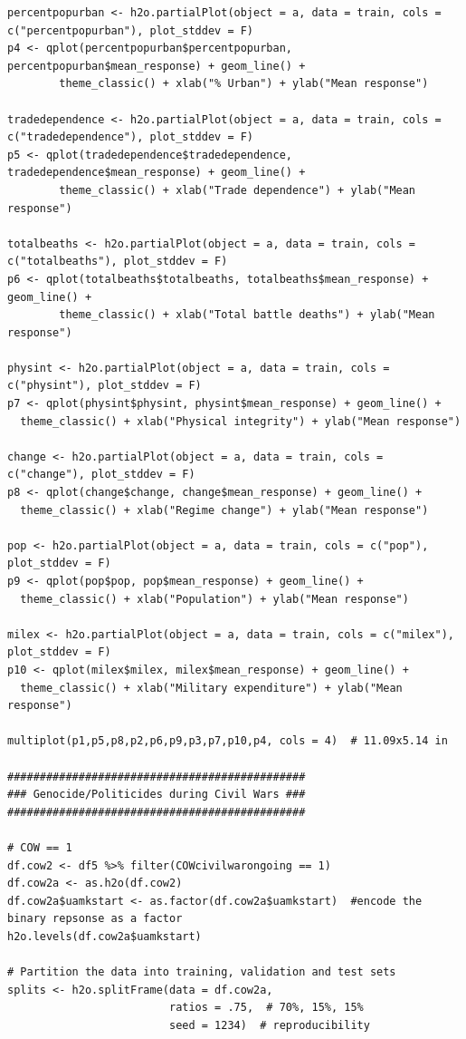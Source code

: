\documentclass[a4paper,12pt]{article}
\begin{document}
\begin{verbatim}
percentpopurban <- h2o.partialPlot(object = a, data = train, cols = c("percentpopurban"), plot_stddev = F)
p4 <- qplot(percentpopurban$percentpopurban, percentpopurban$mean_response) + geom_line() +
        theme_classic() + xlab("% Urban") + ylab("Mean response")

tradedependence <- h2o.partialPlot(object = a, data = train, cols = c("tradedependence"), plot_stddev = F)
p5 <- qplot(tradedependence$tradedependence, tradedependence$mean_response) + geom_line() +
        theme_classic() + xlab("Trade dependence") + ylab("Mean response")

totalbeaths <- h2o.partialPlot(object = a, data = train, cols = c("totalbeaths"), plot_stddev = F)
p6 <- qplot(totalbeaths$totalbeaths, totalbeaths$mean_response) + geom_line() +
        theme_classic() + xlab("Total battle deaths") + ylab("Mean response")

physint <- h2o.partialPlot(object = a, data = train, cols = c("physint"), plot_stddev = F)
p7 <- qplot(physint$physint, physint$mean_response) + geom_line() +
  theme_classic() + xlab("Physical integrity") + ylab("Mean response")

change <- h2o.partialPlot(object = a, data = train, cols = c("change"), plot_stddev = F)
p8 <- qplot(change$change, change$mean_response) + geom_line() +
  theme_classic() + xlab("Regime change") + ylab("Mean response")

pop <- h2o.partialPlot(object = a, data = train, cols = c("pop"), plot_stddev = F)
p9 <- qplot(pop$pop, pop$mean_response) + geom_line() +
  theme_classic() + xlab("Population") + ylab("Mean response")

milex <- h2o.partialPlot(object = a, data = train, cols = c("milex"), plot_stddev = F)
p10 <- qplot(milex$milex, milex$mean_response) + geom_line() +
  theme_classic() + xlab("Military expenditure") + ylab("Mean response")

multiplot(p1,p5,p8,p2,p6,p9,p3,p7,p10,p4, cols = 4)  # 11.09x5.14 in

##############################################
### Genocide/Politicides during Civil Wars ###
##############################################

# COW == 1
df.cow2 <- df5 %>% filter(COWcivilwarongoing == 1)
df.cow2a <- as.h2o(df.cow2)
df.cow2a$uamkstart <- as.factor(df.cow2a$uamkstart)  #encode the binary repsonse as a factor
h2o.levels(df.cow2a$uamkstart)

# Partition the data into training, validation and test sets
splits <- h2o.splitFrame(data = df.cow2a, 
                         ratios = .75,  # 70%, 15%, 15%
                         seed = 1234)  # reproducibility



\end{verbatim}
\end{document}
